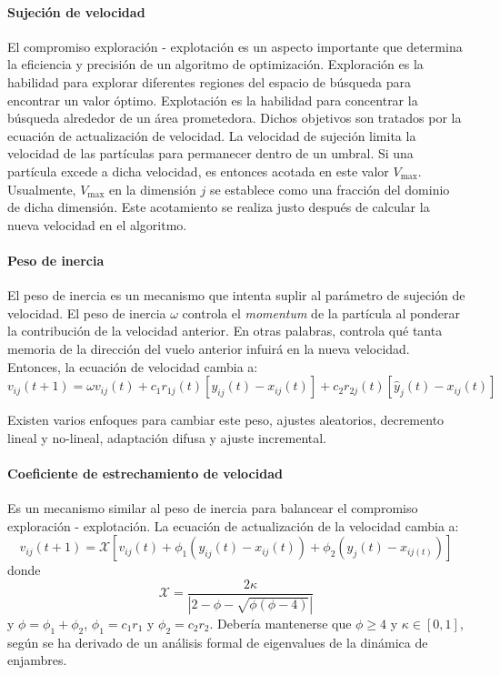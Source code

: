 \documentclass{article}
\begin{document}
\paragraph{Sujeción de velocidad}
El compromiso exploración - explotación es un aspecto importante que determina la eficiencia y precisión de un algoritmo de optimización.
Exploración es la habilidad para explorar diferentes regiones del espacio de búsqueda para encontrar un valor óptimo.
Explotación es la habilidad para concentrar la búsqueda alrededor de un área prometedora.
Dichos objetivos son tratados por la ecuación de actualización de velocidad.
La velocidad de sujeción limita la velocidad de las partículas para permanecer dentro de un umbral.
Si una partícula excede a dicha velocidad, es entonces acotada en este valor $V_{\text{max}}$.
Usualmente, $V_{\text{max}}$ en la dimensión $j$ se establece como una fracción del dominio de dicha dimensión.
Este acotamiento se realiza justo después de calcular la nueva velocidad en el algoritmo.

\paragraph{Peso de inercia}
El peso de inercia es un mecanismo que intenta suplir al parámetro de sujeción de velocidad.
El peso de inercia $\omega$ controla el \emph{momentum} de la partícula al ponderar la contribución de la velocidad anterior.
En otras palabras, controla qué tanta memoria de la dirección del vuelo anterior infuirá en la nueva velocidad.
Entonces, la ecuación de velocidad cambia a:
\begin{equation}
	v_{ij}(t+1) = \omega v_{ij}(t) + c_1r_{1j}(t)[y_{ij}(t) - x_{ij}(t)] + c_2 r_{2j}(t)[\hat{y}_j(t) - x_{ij}(t)]
	\label{eq:velocidad-peso-inercia}
\end{equation}

Existen varios enfoques para cambiar este peso, ajustes aleatorios, decremento lineal y no-lineal, adaptación difusa y ajuste incremental.

\paragraph{Coeficiente de estrechamiento de velocidad}
Es un mecanismo similar al peso de inercia para balancear el compromiso exploración - explotación.
La ecuación de actualización de la velocidad cambia a:
\begin{equation}
	v_{ij}(t+1) = \mathcal{X} [ v_{ij}(t) + \phi_1 (y_{ij}(t) - x_{ij}(t)) + \phi_2(\hat{y}_j(t) - x_{ij(t)})   ]
\end{equation}
donde
$$
\mathcal{X} = \frac{2 \kappa}{| 2 - \phi - \sqrt{\phi ( \phi - 4)}  |}
$$
y $\phi = \phi_1 + \phi_2$, $\phi_1 = c_1 r_1$ y $\phi_2 = c_2 r_2$.
Debería mantenerse que  $\phi \geq 4$ y $\kappa \in [0,1]$, según se ha derivado de un análisis formal de eigenvalues de la dinámica de enjambres.
\end{document}
